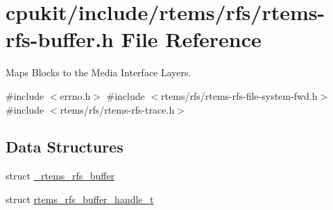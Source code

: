 \hypertarget{rtems-rfs-buffer_8h}{}\section{cpukit/include/rtems/rfs/rtems-\/rfs-\/buffer.h File Reference}
\label{rtems-rfs-buffer_8h}


Maps Blocks to the Media Interface Layers.  


{\ttfamily \#include $<$errno.\+h$>$}\newline
{\ttfamily \#include $<$rtems/rfs/rtems-\/rfs-\/file-\/system-\/fwd.\+h$>$}\newline
{\ttfamily \#include $<$rtems/rfs/rtems-\/rfs-\/trace.\+h$>$}\newline
\subsection*{Data Structures}
\begin{DoxyCompactItemize}
\item 
struct \mbox{\hyperlink{struct__rtems__rfs__buffer}{\+\_\+rtems\+\_\+rfs\+\_\+buffer}}
\item 
struct \mbox{\hyperlink{structrtems__rfs__buffer__handle__t}{rtems\+\_\+rfs\+\_\+buffer\+\_\+handle\+\_\+t}}
\end{DoxyCompactItemize}

